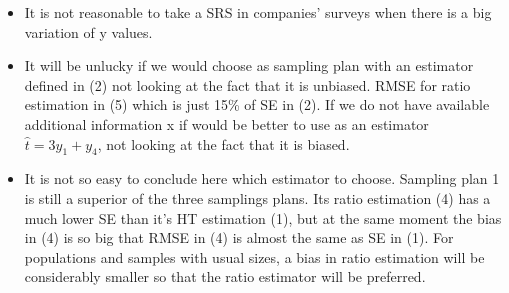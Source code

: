 \documentclass[12pt]{article}
\begin{document}
\begin{enumerate}
{\begin{minipage}[t]{0.97\linewidth}
\begin{itemize}
\item It is not reasonable to take a SRS in companies' surveys when there is a big variation of y values.
\item It will be unlucky if we would choose as sampling plan with an estimator defined in (2) not looking at the fact that it is unbiased. RMSE for ratio estimation  in (5) which is just 15\% of SE in (2). If we do not have available additional information x if would be better to use as an estimator $\hat{t} = 3y_1 + y_4$, not looking at the fact that it is biased.
\item It is not so easy to conclude here which estimator to choose. Sampling plan 1 is still a superior of the three samplings plans. Its ratio estimation (4) has a much lower SE than it's HT estimation (1), but at the same moment the bias in  (4) is so big that RMSE in (4) is almost the same as SE in (1). For populations and samples with usual sizes, a bias in ratio estimation will be considerably smaller so that the ratio estimator will be preferred.  
\end{itemize}



\end{minipage}}
\end{enumerate}
\end{document}
